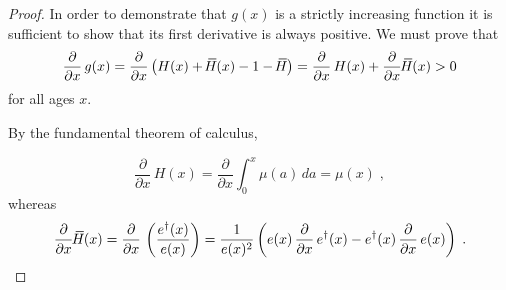 \documentclass[a4paper,twoside, openright, 12pt, leqno]{article}
\newcommand*\xbar[1]{%
   \hbox{%
     \vbox{%
       \hrule height 0.5pt %
       \kern0.3ex%
       \hbox{%
         \kern-0.28em%
         \ensuremath{#1}%
         \kern-0.05em%
       }%
     }%
   }%
}
\begin{document}
\begin{proof}
In order to demonstrate that $g(x)$ is a strictly increasing function it is sufficient to show that its first derivative is always positive. We must prove that
%
\begin{equation}
 \frac{\partial}{\partial x}\,g(x)=\frac{\partial}{\partial x}\left(H(x)+\,\xbar{H}(x)-1-\,\xbar{H}\right)=\frac{\partial}{\partial x}\,H(x)+\frac{\partial}{\partial x}\,\xbar{H}(x)>0
 \label{eq:prop2}
\end{equation}
%
for all ages $x$. 

By the fundamental theorem of calculus,

\begin{equation}
  \frac{\partial}{\partial x}\,H(x) = \frac{\partial }{\partial x} \int_0^x\mu(a)\,da =\mu(x)\;,
  \label{Cumhaz.derv}
\end{equation}
%
whereas
%
\begin{equation*}
  \frac{\partial}{\partial x}\,\xbar{H}(x)= \frac{\partial}{\partial x}\,\left(\frac{e^\dagger(x)}{e(x)}\right)= \frac{1}{e(x)^2}\left(e(x)\,\frac{\partial}{\partial x}\,e^\dagger(x)-e^\dagger(x)\,\frac{\partial}{\partial x}\,e(x)\right)\;.
\end{equation*}


\end{proof}
\end{document}
